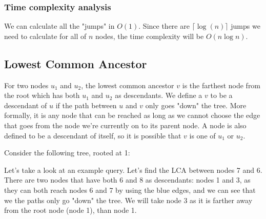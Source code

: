 \documentclass{article}
\begin{document}
\subsubsection{Time complexity analysis}
We can calculate all the "jumps" in $O(1)$. Since there are $\lceil \log (n) \rceil$ jumps we need to calculate for all of $n$ nodes, the time complexity will be $O(n \log n)$.

\subsection{Lowest Common Ancestor}
For two nodes $u_1$ and $u_2$, the lowest common ancestor $v$ is the farthest node from the root which has both $u_1$ and $u_2$ as descendants. We define a $v$ to be a descendant of $u$ if the path between $u$ and $v$ only goes "down" the tree. More formally, it is any node that can be reached as long as we cannot choose the edge that goes from the node we're currently on to its parent node. A node is also defined to be a descendant of itself, so it is possible that $v$ is one of $u_1$ or $u_2$. 

Consider the following tree, rooted at 1:
\begin{center}
 \end{center}

Let's take a look at an example query. Let's find the LCA between nodes 7 and 6. There are two nodes that have both 6 and 8 as descendants: nodes 1 and 3, as they can both reach nodes 6 and 7 by using the blue edges, and we can see that we the paths only go "down" the tree. We will take node 3 as it is farther away from the root node (node 1), than node 1.
\end{document}
